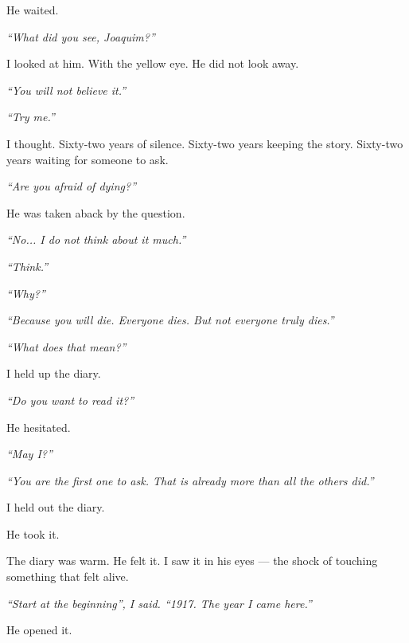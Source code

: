 \noindent He waited.

\noindent \textit{\textquotedblleft{}What did you see, Joaquim?\textquotedblright{}}

\noindent I looked at him. With the yellow eye. He did not look away.

\noindent \textit{\textquotedblleft{}You will not believe it.\textquotedblright{}}

\noindent \textit{\textquotedblleft{}Try me.\textquotedblright{}}

\noindent I thought. Sixty-two years of silence. Sixty-two years keeping the story. Sixty-two years waiting for someone to ask.

\noindent \textit{\textquotedblleft{}Are you afraid of dying?\textquotedblright{}}

\noindent He was taken aback by the question.

\noindent \textit{\textquotedblleft{}No... I do not think about it much.\textquotedblright{}}

\noindent \textit{\textquotedblleft{}Think.\textquotedblright{}}

\noindent \textit{\textquotedblleft{}Why?\textquotedblright{}}

\noindent \textit{\textquotedblleft{}Because you will die. Everyone dies. But not everyone truly dies.\textquotedblright{}}

\noindent \textit{\textquotedblleft{}What does that mean?\textquotedblright{}}

\noindent I held up the diary.

\noindent \textit{\textquotedblleft{}Do you want to read it?\textquotedblright{}}

\noindent He hesitated.

\noindent \textit{\textquotedblleft{}May I?\textquotedblright{}}

\noindent \textit{\textquotedblleft{}You are the first one to ask. That is already more than all the others did.\textquotedblright{}}

\noindent I held out the diary.

\noindent He took it.

\noindent The diary was warm. He felt it. I saw it in his eyes --- the shock of touching something that felt alive.

\noindent \textit{\textquotedblleft{}Start at the beginning\textquotedblright{}\textit{, I said. }\textquotedblleft{}1917. The year I came here.\textquotedblright{}}

\noindent He opened it.

